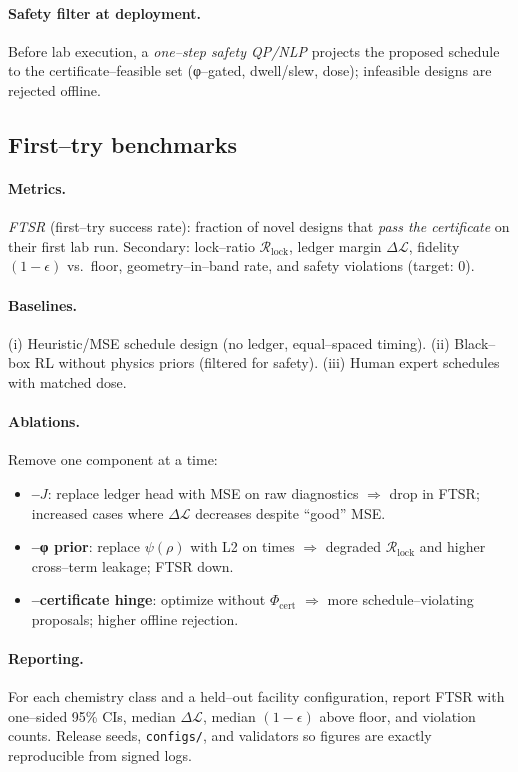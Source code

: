 \documentclass[11pt]{article}
\begin{document}
\paragraph{Safety filter at deployment.}
Before lab execution, a \emph{one–step safety QP/NLP} projects the proposed schedule to the certificate–feasible set (φ–gated, dwell/slew, dose); infeasible designs are rejected offline.

\subsection{First–try benchmarks}\label{sec:lnal-bench}
\paragraph{Metrics.}
\emph{FTSR} (first–try success rate): fraction of novel designs that \emph{pass the certificate} on their first lab run. Secondary: lock–ratio $\mathcal{R}_{\mathrm{lock}}$, ledger margin $\Delta\mathcal{L}$, fidelity $(1-\epsilon)$ vs.\ floor, geometry–in–band rate, and safety violations (target: $0$).

\paragraph{Baselines.}
(i) Heuristic/MSE schedule design (no ledger, equal–spaced timing). (ii) Black–box RL without physics priors (filtered for safety). (iii) Human expert schedules with matched dose.

\paragraph{Ablations.}
Remove one component at a time:
\begin{itemize}
\item \textbf{–$J$}: replace ledger head with MSE on raw diagnostics $\Rightarrow$ drop in FTSR; increased cases where $\Delta\mathcal{L}$ decreases despite “good” MSE.
\item \textbf{–φ prior}: replace $\psi(\rho)$ with L2 on times $\Rightarrow$ degraded $\mathcal{R}_{\mathrm{lock}}$ and higher cross–term leakage; FTSR down.
\item \textbf{–certificate hinge}: optimize without $\Phi_{\mathrm{cert}}$ $\Rightarrow$ more schedule–violating proposals; higher offline rejection.
\end{itemize}

\paragraph{Reporting.}
For each chemistry class and a held–out facility configuration, report FTSR with one–sided 95\% CIs, median $\Delta\mathcal{L}$, median $(1-\epsilon)$ above floor, and violation counts. Release seeds, \texttt{configs/}, and validators so figures are exactly reproducible from signed logs.
\end{document}
